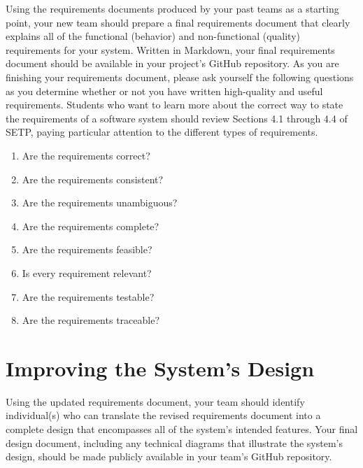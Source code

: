 Using the requirements documents produced by your past teams as a starting point, your new team should prepare a final
requirements document that clearly explains all of the functional (behavior) and non-functional (quality) requirements
for your system. Written in Markdown, your final requirements document should be available in your project's GitHub
repository. As you are finishing your requirements document, please ask yourself the following questions as you
determine whether or not you have written high-quality and useful requirements. Students who want to learn more about
the correct way to state the requirements of a software system should review Sections 4.1 through 4.4 of SETP, paying
particular attention to the different types of requirements.

\vspace*{-.1in}
\begin{enumerate}

  \itemsep 0in

  \item Are the requirements correct?
  \item Are the requirements consistent?
  \item Are the requirements unambiguous?
  \item Are the requirements complete?
  \item Are the requirements feasible?
  \item Is every requirement relevant?
  \item Are the requirements testable?
  \item Are the requirements traceable?

\end{enumerate}
\vspace*{-.15in}

\section*{Improving the System's Design}

Using the updated requirements document, your team should identify individual(s) who can translate the revised
requirements document into a complete design that encompasses all of the system's intended features. Your final design
document, including any technical diagrams that illustrate the system's design, should be made publicly available in
your team's GitHub repository.


